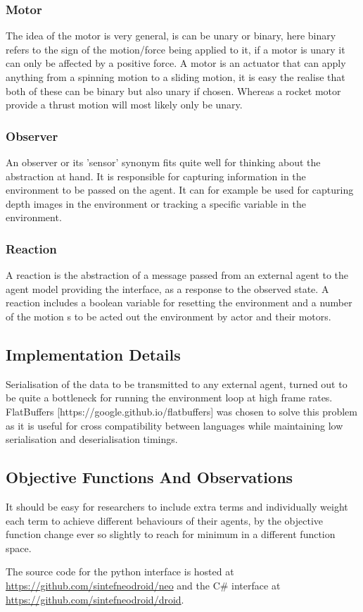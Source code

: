 \subsubsection{Motor}

The idea of the motor is very general, is can be unary or binary, here binary refers to the sign of the motion/force being applied to it, if a motor is unary it can only be affected by a positive force.
A motor is an actuator that can apply anything from a spinning motion to a sliding motion, it is easy the realise that both of these can be binary but also unary if chosen. Whereas a rocket motor provide a thrust motion will most likely only be unary.


\subsubsection{Observer}

An observer or its 'sensor' synonym fits quite well for thinking about the abstraction at hand. It is responsible for capturing information in the environment to be passed on the agent. It can for example be used for capturing depth images in the environment or tracking a specific variable in the environment.

\subsubsection{Reaction}

A reaction is the abstraction of a message passed from an external agent to the agent model providing the interface, as a response to the observed state. A reaction includes a boolean variable for resetting the environment and a number of the motion s to be acted out the environment by actor and their motors.

\subsection{Implementation Details}

Serialisation of the data to be transmitted to any external agent, turned out to be quite a bottleneck for running the environment loop at high frame rates. FlatBuffers [https://google.github.io/flatbuffers] was chosen to solve this problem as it is useful for cross compatibility between languages while maintaining low serialisation and deserialisation timings.

\subsection{Objective Functions And Observations}

It should be easy for researchers to include extra terms and individually weight each term to achieve different behaviours of their agents, by the objective function change ever so slightly to reach for minimum in a different function space.

%

The source code for the python interface is hosted at \url{https://github.com/sintefneodroid/neo} and the C\# interface at \url{https://github.com/sintefneodroid/droid}.